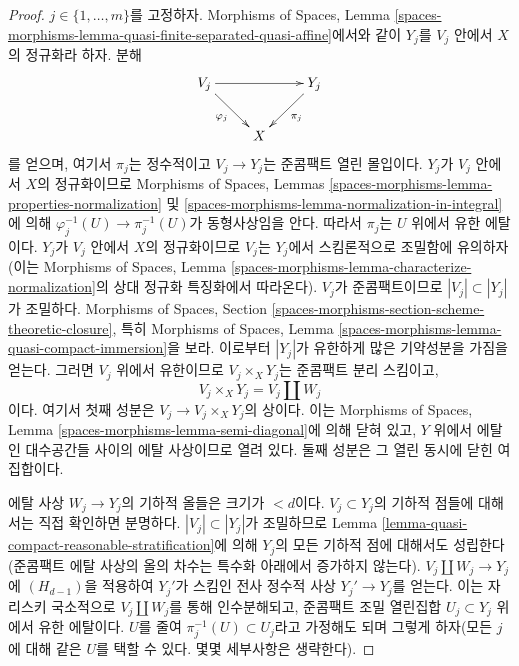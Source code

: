 \begin{proof}
\medskip\noindent
$j \in \{1, \ldots, m\}$를 고정하자.
Morphisms of Spaces, Lemma
\ref{spaces-morphisms-lemma-quasi-finite-separated-quasi-affine}에서와 같이
$Y_j$를 $V_j$ 안에서 $X$의 정규화라 하자. 분해
$$
\xymatrix{
V_j \ar[rr] \ar[rd]_{\varphi_j} & & Y_j \ar[ld]^{\pi_j} \\
& X
}
$$
를 얻으며, 여기서 $\pi_j$는 정수적이고 $V_j \to Y_j$는
준콤팩트 열린 몰입이다. $Y_j$가 $V_j$ 안에서 $X$의 정규화이므로
Morphisms of Spaces, Lemmas
\ref{spaces-morphisms-lemma-properties-normalization} 및
\ref{spaces-morphisms-lemma-normalization-in-integral}에 의해
$\varphi_j^{-1}(U) \to \pi_j^{-1}(U)$가 동형사상임을 안다.
따라서 $\pi_j$는 $U$ 위에서 유한 에탈이다.
$Y_j$가 $V_j$ 안에서 $X$의 정규화이므로 $V_j$는 $Y_j$에서
스킴론적으로 조밀함에 유의하자(이는 Morphisms of Spaces, Lemma
\ref{spaces-morphisms-lemma-characterize-normalization}의 상대 정규화
특징화에서 따라온다). $V_j$가 준콤팩트이므로
$|V_j| \subset |Y_j|$가 조밀하다. Morphisms of Spaces, Section
\ref{spaces-morphisms-section-scheme-theoretic-closure}, 특히
Morphisms of Spaces, Lemma
\ref{spaces-morphisms-lemma-quasi-compact-immersion}을 보라.
이로부터 $|Y_j|$가 유한하게 많은 기약성분을 가짐을 얻는다.
그러면 $V_j$ 위에서 유한이므로
$V_j \times_X Y_j$는 준콤팩트 분리 스킴이고,
$$
V_j \times_X Y_j = V_j \amalg W_j
$$
이다. 여기서 첫째 성분은 $V_j \to V_j \times_X Y_j$의 상이다.
이는 Morphisms of Spaces, Lemma
\ref{spaces-morphisms-lemma-semi-diagonal}에 의해 닫혀 있고,
$Y$ 위에서 에탈인 대수공간들 사이의 에탈 사상이므로 열려 있다.
둘째 성분은 그 열린 동시에 닫힌 여집합이다.

\medskip\noindent
에탈 사상 $W_j \to Y_j$의 기하적 올들은 크기가 $< d$이다.
$V_j \subset Y_j$의 기하적 점들에 대해서는 직접 확인하면 분명하다.
$|V_j| \subset |Y_j|$가 조밀하므로 Lemma
\ref{lemma-quasi-compact-reasonable-stratification}에 의해
$Y_j$의 모든 기하적 점에 대해서도 성립한다(준콤팩트 에탈 사상의
올의 차수는 특수화 아래에서 증가하지 않는다).
$V_j \amalg W_j \to Y_j$에 $(H_{d - 1})$을 적용하여 $Y_j'$가
스킴인 전사 정수적 사상 $Y_j' \to Y_j$를 얻는다. 이는 자리스키
국소적으로 $V_j \amalg W_j$를 통해 인수분해되고,
준콤팩트 조밀 열린집합 $U_j \subset Y_j$ 위에서 유한 에탈이다.
$U$를 줄여 $\pi_j^{-1}(U) \subset U_j$라고 가정해도 되며 그렇게
하자(모든 $j$에 대해 같은 $U$를 택할 수 있다. 몇몇 세부사항은
생략한다).


\end{proof}

